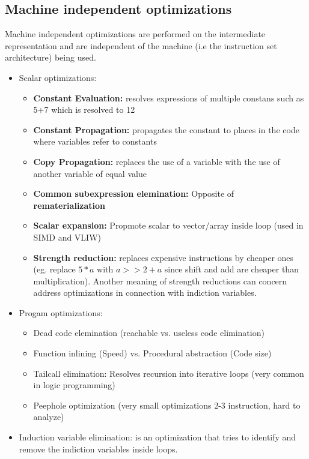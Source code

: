 \documentclass[a4paper,10pt]{article}
\begin{document}
\subsection{Machine independent optimizations}
Machine independent optimizations are performed on the intermediate representation and are independent of the machine (i.e the instruction 
set architecture) being used.
\begin{itemize}
 \item Scalar optimizations:
 \begin{itemize}
     \item \textbf{Constant Evaluation:} resolves expressions of multiple constans such as 5+7 which is resolved to 12
     \item \textbf{Constant Propagation:} propagates the constant to places in the code where variables refer to constants
     \item \textbf{Copy Propagation:} replaces the use of a variable with the use of another variable of equal value
     \item \textbf{Common subexpression elemination:} Opposite of \textbf{rematerialization}
     \item \textbf{Scalar expansion:} Propmote scalar to vector/array inside loop (used in SIMD and VLIW)
     \item \textbf{Strength reduction:} replaces expensive instructions by cheaper ones (eg. replace $5*a$ with $a>>2+a$ since shift and add are cheaper than multiplication). Another meaning of strength reductions can concern address optimizations in connection with indiction variables.
 \end{itemize}
 \item Progam optimizations:
 \begin{itemize}
     \item Dead code elemination (reachable vs. useless code elimination)
     \item Function inlining (Speed) vs. Procedural abstraction (Code size)
     \item Tailcall elimination: Resolves recursion into iterative loops (very common in logic programming)
     \item Peephole optimization (very small optimizations 2-3 instruction, hard to analyze)
 \end{itemize}
 \item Induction variable elimination: is an optimization that tries to identify and remove the indiction variables inside loops.
  \begin{itemize}

\end{itemize}
\end{itemize}
\end{document}
